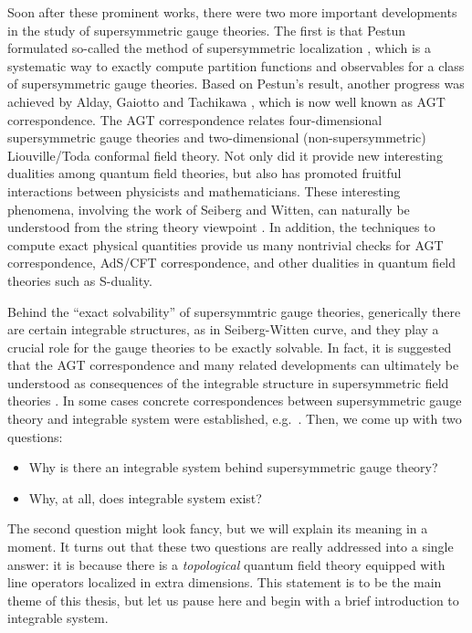 Soon after these prominent works, there were two more important developments in the study of
supersymmetric gauge theories.
The first is that Pestun formulated so-called the method of supersymmetric localization \cite{Pestun:2007rz},
which is a systematic way to exactly compute partition functions and observables
for a class of supersymmetric gauge theories.
Based on Pestun's result, another progress was achieved by
Alday, Gaiotto and Tachikawa \cite{Alday:2009aq}, which
is now well known as AGT correspondence.
The AGT correspondence relates four-dimensional supersymmetric gauge theories and
two-dimensional (non-supersymmetric) Liouville/Toda conformal field theory.
Not only did it provide new interesting dualities among quantum field theories,
but also has promoted fruitful interactions between physicists and mathematicians.
These interesting phenomena, involving the work of Seiberg and Witten,
can naturally be understood from the string theory viewpoint \cite{Witten:1997sc,Gaiotto:2009we}.
In addition, the techniques to compute exact physical quantities provide us many nontrivial checks
for AGT correspondence, AdS/CFT correspondence,
and other dualities in quantum field theories such as S-duality.


Behind the ``exact solvability'' of supersymmtric gauge theories, generically there are certain integrable
structures, as in Seiberg-Witten curve, and they play a crucial role for the gauge theories to be
exactly solvable.
In fact, it is suggested that the AGT correspondence and many related developments can ultimately
be understood as consequences of the integrable structure in
supersymmetric field theories \cite{Gaiotto:2009hg,Teschner:2010je}.
In some cases concrete correspondences between
supersymmetric gauge theory and integrable system were established,
e.g.~\cite{Nekrasov:2009uh,Nekrasov:2009ui,Nekrasov:2009rc,Yamazaki:2012cp,Terashima:2012cx,Yamazaki:2013nra}.
Then, we come up with two questions:
\begin{itemize}
    \item Why is there an integrable system behind supersymmetric gauge theory?
    \item Why, at all, does integrable system exist?
\end{itemize}
The second question might look fancy, but we will explain its meaning in a moment.
It turns out that these two questions are really addressed into a single answer:
it is because there is a \emph{topological} quantum field theory
equipped with line operators localized in extra dimensions.
This statement is to be the main theme of this thesis, but let us pause here and
begin with a brief introduction
to integrable system.


